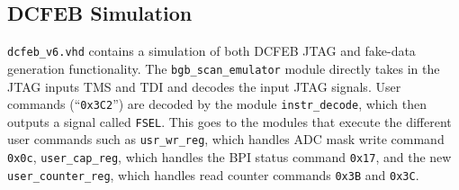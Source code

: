 \documentclass[10pt,a4paper]{article}
\begin{document}
\subsection{DCFEB Simulation}

\texttt{dcfeb\_v6.vhd} contains a simulation of both DCFEB JTAG and fake-data generation functionality. The \texttt{bgb\_scan\_emulator} module directly takes in the JTAG inputs TMS and TDI and decodes the input JTAG signals. User commands (``\texttt{0x3C2}'') are decoded by the module \texttt{instr\_decode}, which then outputs a signal called \texttt{FSEL}. This goes to the modules that execute the different user commands such as \texttt{usr\_wr\_reg}, which handles ADC mask write command \texttt{0x0c}, \texttt{user\_cap\_reg}, which handles the BPI status command \texttt{0x17}, and the new \texttt{user\_counter\_reg}, which handles read counter commands \texttt{0x3B} and \texttt{0x3C}.

%
%
\end{document}
